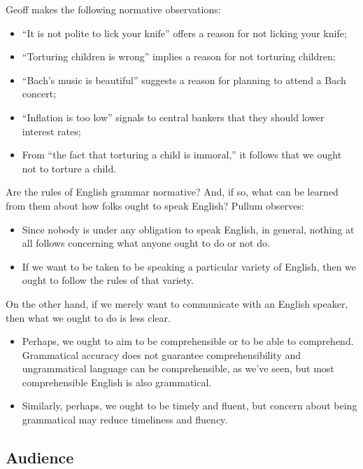 Geoff \textcite[205]{Pullum2019} makes the following normative observations:
\begin{itemize}[noitemsep]
    \item ``It is not polite to lick your knife'' offers a reason for not licking your knife;
    \item ``Torturing children is wrong'' implies a reason for not torturing children;
    \item ``Bach's music is beautiful'' suggests a reason for planning to attend a Bach concert;
    \item ``Inflation is too low'' signals to central bankers that they should lower interest rates;
    \item From ``the fact that torturing a child is immoral,'' it follows that we ought not to torture a child.
\end{itemize}

Are the rules of English grammar normative? And, if so, what can be learned from them about how folks ought to speak English? Pullum observes:
\begin{itemize}[noitemsep]
    \item Since nobody is under any obligation to speak English, in general, nothing at all follows concerning what anyone ought to do or not do.
    \item If we want to be taken to be speaking a particular variety of English, then we ought to follow the rules of that variety.
\end{itemize}

On the other hand, if we merely want to communicate with an English speaker, then what we ought to do is less clear.

\begin{itemize}[noitemsep]
    \item Perhaps, we ought to aim to be comprehensible or to be able to comprehend. Grammatical accuracy does not guarantee comprehensibility and ungrammatical language can be comprehensible, as we've seen, but most comprehensible English is also grammatical.
    \item Similarly, perhaps, we ought to be timely and fluent, but concern about being grammatical may reduce timeliness and fluency.
\end{itemize}

\subsection{Audience}

